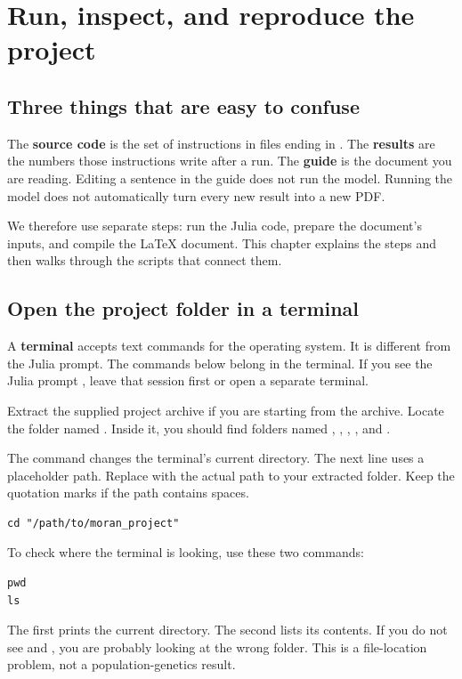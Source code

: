\chapter{Run, inspect, and reproduce the project}
\label{chap:reproduce}

\section{Three things that are easy to confuse}

The \textbf{source code} is the set of instructions in files ending in
. The \textbf{results} are the numbers those instructions write
after a run. The \textbf{guide} is the document you are reading. Editing a
sentence in the guide does not run the model. Running the model does not
automatically turn every new result into a new PDF.

We therefore use separate steps: run the Julia code, prepare the document's
inputs, and compile the LaTeX document. This chapter explains the steps and
then walks through the scripts that connect them.

\section{Open the project folder in a terminal}

A \textbf{terminal} accepts text commands for the operating system. It is
different from the Julia prompt. The commands below belong in the terminal.
If you see the Julia prompt , leave that session first or open
a separate terminal.

Extract the supplied project archive if you are starting from the archive.
Locate the folder named . Inside it, you should find
folders named , , , ,
and .

The command  changes the terminal's current directory. The next
line uses a placeholder path. Replace  with
the actual path to your extracted folder. Keep the quotation marks if the
path contains spaces.

\begin{lstlisting}[language={},numbers=none]
cd "/path/to/moran_project"
\end{lstlisting}

To check where the terminal is looking, use these two commands:
\begin{lstlisting}[language={},numbers=none]
pwd
ls
\end{lstlisting}
The first prints the current directory. The second lists its contents. If
you do not see  and , you are probably looking at
the wrong folder. This is a file-location problem, not a population-genetics
result.


